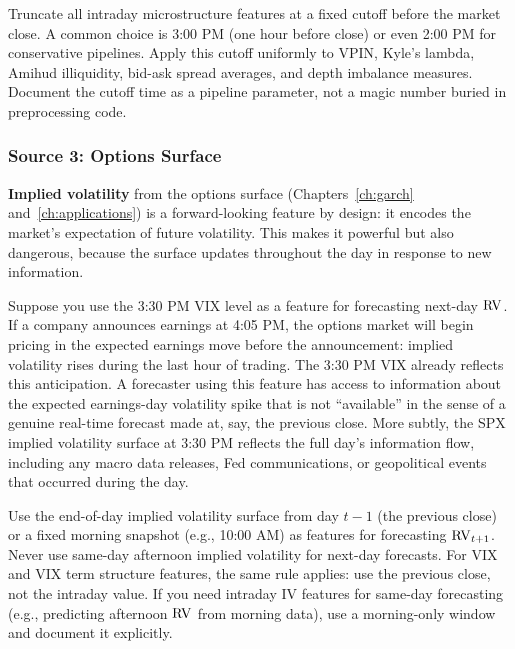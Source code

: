\begin{keyidea}
Truncate all intraday microstructure features at a fixed cutoff before the market close.
A common choice is 3:00 PM (one hour before close) or even 2:00 PM for conservative pipelines.
Apply this cutoff uniformly to VPIN, Kyle's lambda, Amihud illiquidity, bid-ask spread averages, and depth imbalance measures.
Document the cutoff time as a pipeline parameter, not a magic number buried in preprocessing code.
\end{keyidea}


\subsubsection{Source 3: Options Surface}

\textbf{Implied volatility} from the options surface (Chapters~\ref{ch:garch} and~\ref{ch:applications}) is a forward-looking feature by design: it encodes the market's expectation of future volatility.
This makes it powerful but also dangerous, because the surface updates throughout the day in response to new information.

\begin{warning}
Suppose you use the 3:30 PM VIX level as a feature for forecasting next-day $\operatorname{RV}$.
If a company announces earnings at 4:05 PM, the options market will begin pricing in the expected earnings move before the announcement: implied volatility rises during the last hour of trading.
The 3:30 PM VIX already reflects this anticipation.
A forecaster using this feature has access to information about the expected earnings-day volatility spike that is not ``available'' in the sense of a genuine real-time forecast made at, say, the previous close.
More subtly, the SPX implied volatility surface at 3:30 PM reflects the full day's information flow, including any macro data releases, Fed communications, or geopolitical events that occurred during the day.
\end{warning}

\begin{keyidea}
Use the end-of-day implied volatility surface from day $t-1$ (the previous close) or a fixed morning snapshot (e.g., 10:00 AM) as features for forecasting $\operatorname{RV}_{t+1}$.
Never use same-day afternoon implied volatility for next-day forecasts.
For VIX and VIX term structure features, the same rule applies: use the previous close, not the intraday value.
If you need intraday IV features for same-day forecasting (e.g., predicting afternoon $\operatorname{RV}$ from morning data), use a morning-only window and document it explicitly.
\end{keyidea}


